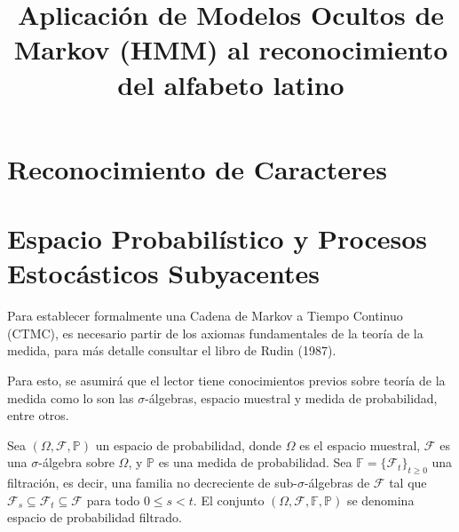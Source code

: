 \documentclass[
  spanish,
  us-letterpaper,
  DIV=11,
  numbers=noendperiod]{scrreprt}
\title{Aplicación de Modelos Ocultos de Markov (HMM) al reconocimiento
del alfabeto latino}
\author{}
\date{}
\renewcommand*\contentsname{Tabla de contenidos}
\newcommand\contentsname{Tabla de contenidos}
\newcounter{quartocalloutnteno}
\newcommand{\quartocalloutnte}[1]{\refstepcounter{quartocalloutnteno}\label{#1}}
\begin{document}
\maketitle

\renewcommand*\contentsname{Tabla de contenidos}
{
\hypersetup{linkcolor=}
\setcounter{tocdepth}{2}
\tableofcontents
}


\chapter{Reconocimiento de
Caracteres}\label{reconocimiento-de-caracteres}


\chapter{Espacio Probabilístico y Procesos Estocásticos
Subyacentes}\label{espacio-probabiluxedstico-y-procesos-estocuxe1sticos-subyacentes}

Para establecer formalmente una Cadena de Markov a Tiempo Continuo
(CTMC), es necesario partir de los axiomas fundamentales de la teoría de
la medida, para más detalle consultar el libro de Rudin (1987).

Para esto, se asumirá que el lector tiene conocimientos previos sobre
teoría de la medida como lo son las \(\sigma\)-álgebras, espacio
muestral y medida de probabilidad, entre otros.

\begin{tcolorbox}[enhanced jigsaw, coltitle=black, arc=.35mm, toptitle=1mm, bottomrule=.15mm, rightrule=.15mm, toprule=.15mm, colframe=quarto-callout-note-color-frame, colback=white, bottomtitle=1mm, title=\textcolor{quarto-callout-note-color}{\faInfo}\hspace{0.5em}{Nota \ref*{nte-espacio-filtrado}: Definición (Espacio de Probabilidad Filtrado)}, titlerule=0mm, leftrule=.75mm, left=2mm, opacitybacktitle=0.6, opacityback=0, colbacktitle=quarto-callout-note-color!10!white, breakable]

\quartocalloutnte{nte-espacio-filtrado} 

Sea \((\Omega, \mathcal{F}, \mathbb{P})\) un espacio de probabilidad,
donde \(\Omega\) es el espacio muestral, \(\mathcal{F}\) es una
\(\sigma\)-álgebra sobre \(\Omega\), y \(\mathbb{P}\) es una medida de
probabilidad. Sea \(\mathbb{F} = \{\mathcal{F}_t\}_{t \ge 0}\) una
filtración, es decir, una familia no decreciente de
sub-\(\sigma\)-álgebras de \(\mathcal{F}\) tal que
\(\mathcal{F}_s \subseteq \mathcal{F}_t \subseteq \mathcal{F}\) para
todo \(0 \le s < t\). El conjunto
\((\Omega, \mathcal{F}, \mathbb{F}, \mathbb{P})\) se denomina espacio de
probabilidad filtrado.

\end{tcolorbox}
\end{document}
